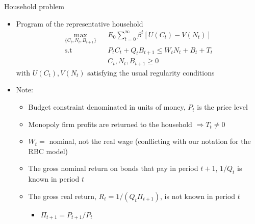 \documentclass[9pt,xcolor={dvipsnames}]{beamer}
\newcommand{\bit}{\begin{itemize}}
\newcommand{\eit}{\end{itemize}}
\begin{document}
\begin{frame}{Household problem}

\bit
\setlength\itemsep{1.5em}

\item Program of the representative household 
\begin{eqnarray}
\max_{\{C_t, N_t, B_{t+1}\}} && E_0 \sum_{t=0}^{\infty} \beta^t \left[U(C_t)- V(N_t) \right]\nonumber \\
\text{s.t} && P_t C_t + Q_t B_{t+1} \leq W_t N_t + B_{t} + T_t \nonumber \\
&& C_t, N_t, B_{t+1}  \geq 0 \nonumber
\end{eqnarray}
with $U(C_t), V(N_t)$ satisfying the usual regularity conditions 

\item Note:
\bit
\setlength\itemsep{0.5em}
\item Budget constraint denominated in units of money, $P_t$ is the price level

\item Monopoly firm profits are returned to the household $\Rightarrow $$T_t \neq 0$ 

\item $W_t = $ nominal, not the real wage (conflicting with our notation for the RBC model)

\item The gross nominal return on bonds that pay in period $t+1$, $1/Q_t$ is known in period $t$

\item The gross real return, $R_t=1/(Q_t \Pi_{t+1} ) $, is not known in period $t$
	\bit
		\item $\Pi_{t+1} = P_{t+1}/P_t$
	\eit
\eit

\eit

\end{frame}
\end{document}
